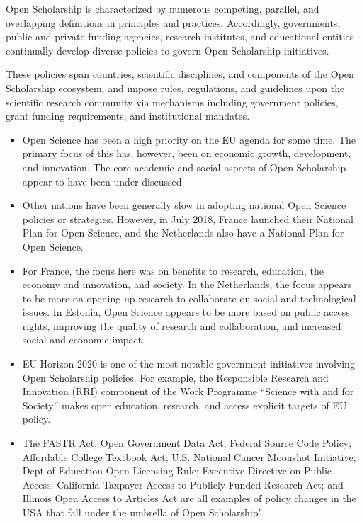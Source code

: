 \documentclass[]{article}
\begin{document}
Open Scholarship is characterized by numerous competing, parallel, and
overlapping definitions in principles and practices. Accordingly,
governments, public and private funding agencies, research institutes,
and educational entities continually develop diverse policies to govern
Open Scholarship initiatives.

These policies span countries, scientific disciplines, and components of
the Open Scholarship ecosystem, and impose rules, regulations, and
guidelines upon the scientific research community via mechanisms
including government policies, grant funding requirements, and
institutional mandates.

\begin{itemize}
\item
  Open Science has been a high priority on the EU agenda for some time.
  The primary focus of this has, however, been on economic growth,
  development, and innovation. The core academic and social aspects of
  Open Scholarship appear to have been under-discussed.
\item
  Other nations have been generally slow in adopting national Open
  Science policies or strategies. However, in July 2018, France launched
  their National Plan for Open Science, and the Netherlands also have a
  National Plan for Open Science.
\item
  For France, the focus here was on benefits to research, education, the
  economy and innovation, and society. In the Netherlands, the focus
  appears to be more on opening up research to collaborate on social and
  technological issues. In Estonia, Open Science appears to be more
  based on public access rights, improving the quality of research and
  collaboration, and increased social and economic impact.
\item
  EU Horizon 2020 is one of the most notable government initiatives
  involving Open Scholarship policies. For example, the Responsible
  Research and Innovation (RRI) component of the Work Programme
  ``Science with and for Society'' makes open education, research, and
  access explicit targets of EU policy.
\item
  The FASTR Act, Open Government Data Act, Federal Source Code Policy;
  Affordable College Textbook Act; U.S. National Cancer Moonshot
  Initiative; Dept of Education Open Licensing Rule; Executive Directive
  on Public Access; California Taxpayer Access to Publicly Funded
  Research Act; and Illinois Open Access to Articles Act are all
  examples of policy changes in the USA that fall under the umbrella of
  Open Scholarship'.
\end{itemize}
\end{document}

